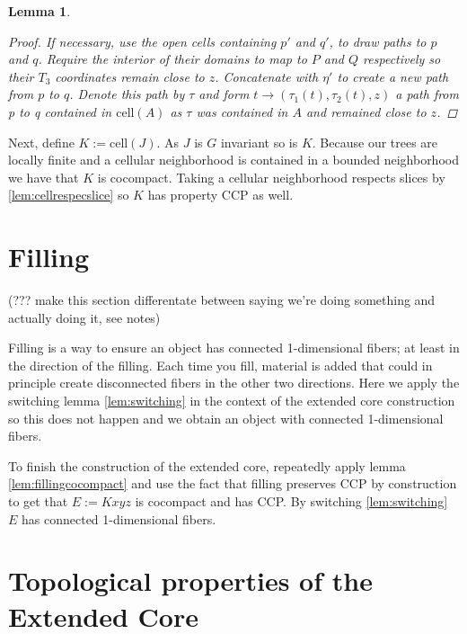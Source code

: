 \documentclass[12pt,parskip=full]{report}
\theoremstyle{plain}
\newtheorem{lem}[thm]{Lemma}
\theoremstyle{definition}
\begin{document}
\begin{lem}
\begin{proof}
If necessary, use the open cells containing \(p'\) and \(q'\), to draw paths  to \(p\) and \(q\). Require the interior of their domains to map to \(P\) and \(Q\) respectively so their \(T_3\) coordinates remain close to \(z\). Concatenate with \(\eta'\) to create a new path from \(p\) to \(q\). Denote this path by \(\tau\) and form \(t\to (\tau_1(t), \tau_2(t), z)\) a path from p to q contained in \(\text{cell}(A)\) as \(\tau\) was contained in \(A\) and remained close to \(z\).
    
    \end{proof}
    
    
\end{lem}

        
        
        Next, define \(K := \text{cell}(J)\). As \(J\) is \(G\) invariant so is \(K\).  Because our trees are locally finite and a cellular neighborhood is contained in a bounded neighborhood we have that \(K\) is cocompact. Taking a cellular neighborhood respects slices by \ref{lem:cellrespecslice}  so \(K\) has property CCP as well.

\section{Filling}

(??? make this section differentate between saying we're doing something and actually doing it, see notes)

Filling is a way to ensure an object has connected 1-dimensional fibers; at least in the direction of the filling. Each time you fill, material is added that could in principle create disconnected fibers in the other two  directions. Here we apply the switching lemma \ref{lem:switching} in the context of the extended core construction so this does not happen and we obtain an object with connected 1-dimensional fibers. 



To finish the construction of the extended core, repeatedly apply lemma \ref{lem:fillingcocompact} and use the fact that filling preserves CCP  by construction to get that \(E:= Kxyz\) is cocompact and has CCP. By switching \ref{lem:switching} \(E\) has connected 1-dimensional fibers. 

\section{Topological properties of the Extended Core}
\end{document}

